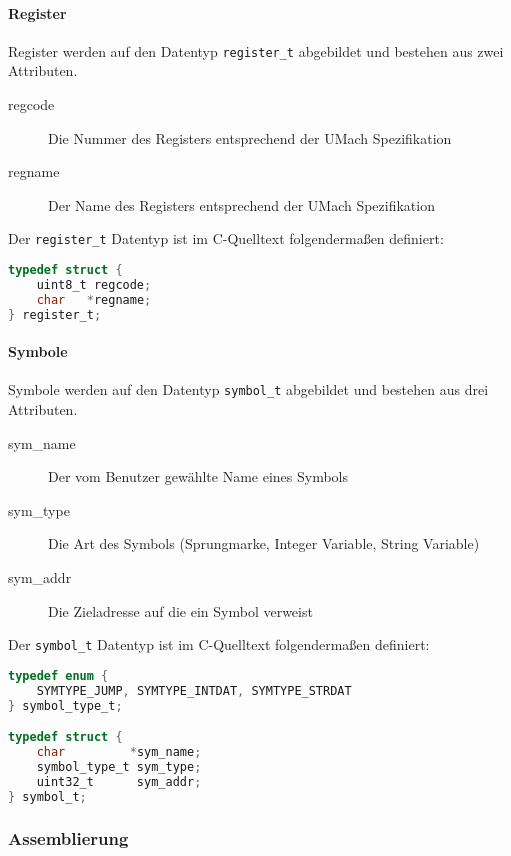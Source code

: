\paragraph{Register} Register werden auf den Datentyp \texttt{register\_t}
abgebildet und bestehen aus zwei Attributen.

\begin{description}
    \item[regcode] Die Nummer des Registers entsprechend der UMach Spezifikation
    \item[regname] Der Name des Registers entsprechend der UMach Spezifikation
\end{description}

Der \texttt{register\_t} Datentyp ist im C-Quelltext folgendermaßen definiert:

\begin{lstlisting}[language=C]
typedef struct {
    uint8_t regcode;
    char   *regname;
} register_t;
\end{lstlisting}

\paragraph{Symbole} Symbole werden auf den Datentyp \texttt{symbol\_t}
abgebildet und bestehen aus drei Attributen.

\begin{description}
    \item[sym\_name] Der vom Benutzer gewählte Name eines Symbols
    \item[sym\_type] Die Art des Symbols (Sprungmarke, Integer Variable, String Variable)
    \item[sym\_addr] Die Zieladresse auf die ein Symbol verweist
\end{description}

Der \texttt{symbol\_t} Datentyp ist im C-Quelltext folgendermaßen definiert:

\begin{lstlisting}[language=C]
typedef enum {
    SYMTYPE_JUMP, SYMTYPE_INTDAT, SYMTYPE_STRDAT
} symbol_type_t;

typedef struct {
    char         *sym_name;
    symbol_type_t sym_type;
    uint32_t      sym_addr;
} symbol_t;
\end{lstlisting}

\subsubsection{Assemblierung}

